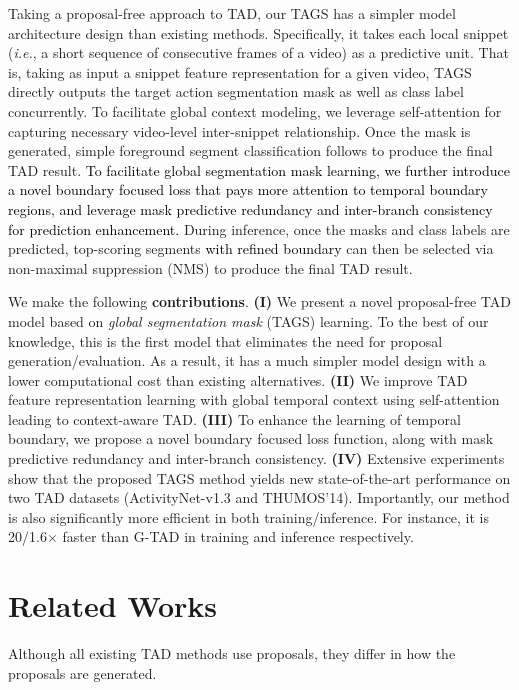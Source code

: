 \documentclass[runningheads]{llncs}
\newcommand{\ie}{\textit{i.e.}}
\newcommand{\shortmodelname}{TAGS}
\begin{document}
Taking a proposal-free approach to TAD, our {\shortmodelname} has a simpler model architecture design than existing methods. Specifically, it takes each local snippet (\ie, a short sequence of consecutive frames of a video) as a predictive unit. That is, taking as input a snippet feature representation for a given video,
{\shortmodelname} directly outputs the target action segmentation mask as well as class label concurrently.
To facilitate global context modeling,
we leverage self-attention \cite{vaswani2017attention} 
for capturing necessary video-level inter-snippet relationship. Once the mask is generated, simple foreground segment classification follows to produce the final TAD result. 
\textcolor{black}{To facilitate global segmentation mask learning, we further introduce a novel boundary focused loss that pays more attention to temporal boundary regions, and leverage mask predictive redundancy and inter-branch consistency for
prediction enhancement.} 
During inference, once the masks and class labels are predicted, 
top-scoring segments \textcolor{black}{with refined boundary} can then be selected via non-maximal suppression (NMS)
to produce the final TAD result. 


We make the following {\bf contributions}.
{\bf (I)} We present a novel proposal-free TAD model based on {\em global segmentation mask} ({\shortmodelname}) learning. To the best of our knowledge, this is the first model that eliminates the need for proposal generation/evaluation. As a result, it has a much simpler model design with a lower computational cost than existing alternatives. 
{\bf (II)} 
We improve TAD feature representation learning with global 
temporal context using self-attention leading to context-aware TAD. 
{{\bf (III)} To enhance the learning of temporal boundary, {\color{black} we propose a novel boundary focused loss function, along with mask predictive redundancy and inter-branch consistency.}}
{\bf (IV)}
Extensive experiments show that the proposed {\shortmodelname} method yields new state-of-the-art performance on two TAD datasets (ActivityNet-v1.3 and THUMOS'14).
Importantly, our method is also significantly more efficient in both training/inference. For instance, it is
 {20/1.6}$\times$ faster than G-TAD \cite{xu2020g} in training and inference respectively.


\section{Related Works}
\label{sec:related}
Although all existing TAD methods use proposals, they differ in how the proposals are generated.
\end{document}
